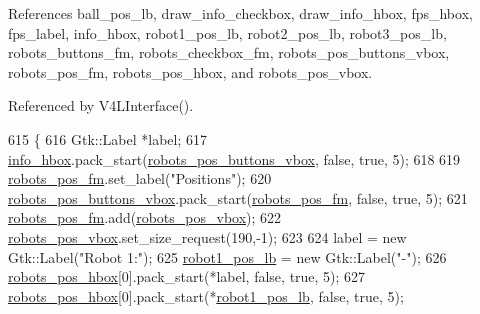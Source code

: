 References ball\+\_\+pos\+\_\+lb, draw\+\_\+info\+\_\+checkbox, draw\+\_\+info\+\_\+hbox, fps\+\_\+hbox, fps\+\_\+label, info\+\_\+hbox, robot1\+\_\+pos\+\_\+lb, robot2\+\_\+pos\+\_\+lb, robot3\+\_\+pos\+\_\+lb, robots\+\_\+buttons\+\_\+fm, robots\+\_\+checkbox\+\_\+fm, robots\+\_\+pos\+\_\+buttons\+\_\+vbox, robots\+\_\+pos\+\_\+fm, robots\+\_\+pos\+\_\+hbox, and robots\+\_\+pos\+\_\+vbox.



Referenced by V4\+L\+Interface().


\begin{DoxyCode}
615                                                       \{
616         Gtk::Label *label;
617         \hyperlink{class_v_s_s_s___g_u_i_1_1_v4_l_interface_ae189e841cf752e3b018b2e0eb9f65ea7}{info\_hbox}.pack\_start(\hyperlink{class_v_s_s_s___g_u_i_1_1_v4_l_interface_a40f35c5e603def9a0ad69f7d761e0825}{robots\_pos\_buttons\_vbox}, \textcolor{keyword}{false}, \textcolor{keyword}{true}, 5);
618 
619         \hyperlink{class_v_s_s_s___g_u_i_1_1_v4_l_interface_a26abe1e1e6abc1ac01aaeca2f0df2a8f}{robots\_pos\_fm}.set\_label(\textcolor{stringliteral}{"Positions"});
620         \hyperlink{class_v_s_s_s___g_u_i_1_1_v4_l_interface_a40f35c5e603def9a0ad69f7d761e0825}{robots\_pos\_buttons\_vbox}.pack\_start(\hyperlink{class_v_s_s_s___g_u_i_1_1_v4_l_interface_a26abe1e1e6abc1ac01aaeca2f0df2a8f}{robots\_pos\_fm}, \textcolor{keyword}{false}, \textcolor{keyword}{true}, 
      5);
621         \hyperlink{class_v_s_s_s___g_u_i_1_1_v4_l_interface_a26abe1e1e6abc1ac01aaeca2f0df2a8f}{robots\_pos\_fm}.add(\hyperlink{class_v_s_s_s___g_u_i_1_1_v4_l_interface_a4df8bbaf8380ca272cf9f808cb063928}{robots\_pos\_vbox});
622         \hyperlink{class_v_s_s_s___g_u_i_1_1_v4_l_interface_a4df8bbaf8380ca272cf9f808cb063928}{robots\_pos\_vbox}.set\_size\_request(190,-1);
623 
624         label = \textcolor{keyword}{new} Gtk::Label(\textcolor{stringliteral}{"Robot 1:"});
625         \hyperlink{class_v_s_s_s___g_u_i_1_1_v4_l_interface_a568a4223fbff21740c879e612f903bf8}{robot1\_pos\_lb} = \textcolor{keyword}{new} Gtk::Label(\textcolor{stringliteral}{"-"});
626         \hyperlink{class_v_s_s_s___g_u_i_1_1_v4_l_interface_a02292f4f80004b3ef0a791decfa5cffe}{robots\_pos\_hbox}[0].pack\_start(*label, \textcolor{keyword}{false}, \textcolor{keyword}{true}, 5);
627         \hyperlink{class_v_s_s_s___g_u_i_1_1_v4_l_interface_a02292f4f80004b3ef0a791decfa5cffe}{robots\_pos\_hbox}[0].pack\_start(*\hyperlink{class_v_s_s_s___g_u_i_1_1_v4_l_interface_a568a4223fbff21740c879e612f903bf8}{robot1\_pos\_lb}, \textcolor{keyword}{false}, \textcolor{keyword}{true}, 5);

\end{DoxyCode}
